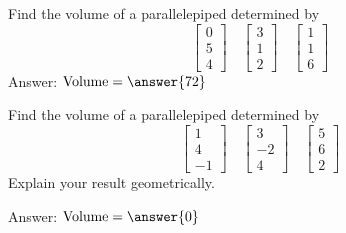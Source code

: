 \documentclass{ximera}
\author{Zack Reed}
\begin{document}
%   

   
\begin{problem}\label{prob:volparallelepiped}
  Find the volume of a parallelepiped determined by
  $$\begin{bmatrix}0\\5\\4\end{bmatrix}\quad\begin{bmatrix}3\\1\\2\end{bmatrix}\quad\begin{bmatrix}1\\1\\6\end{bmatrix}$$
  Answer: $\mbox{Volume}=\answer{72}$
  \end{problem}
   
  \begin{problem}\label{prob:volparallelepiped0}
  Find the volume of a parallelepiped determined by
  $$\begin{bmatrix}1\\4\\-1\end{bmatrix}\quad\begin{bmatrix}3\\-2\\4\end{bmatrix}\quad\begin{bmatrix}5\\6\\2\end{bmatrix}$$
  Explain your result geometrically.
   
  Answer: $\mbox{Volume}=\answer{0}$
  \end{problem}
\end{document}
